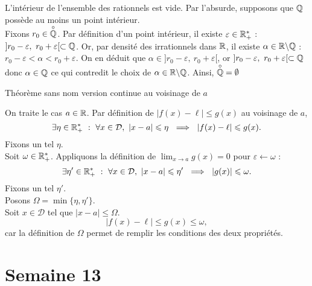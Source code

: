 \documentclass{article}
\renewenvironment{question_kholle}[2][ ]
{
	\subsection{\texorpdfstring{#2}{}}
	\notblank{#1}
	{
		\noindent #1
		\bigbreak
	}
	{}
	\begin{proof}
}
{
	\end{proof}
}
\begin{document}
\begin{question_kholle}
  [Montrons que : $ \overset{\circ}{\Q} = \emptyset $]
  {L'intérieur de l'ensemble des rationnels est vide.}
  Par l'absurde, supposons que $\mathbb Q$ possède au moins un point intérieur. \\ Fixons $r_0 \in \overset{\circ}{\mathbb Q}$. Par définition d'un point intérieur, il existe $\varepsilon \in \mathbb R _+ ^* $ : $]r_0 - \varepsilon , \ r_0 + \varepsilon[ \subset \mathbb Q$. Or, par densité des irrationnels dans $\mathbb R$, il existe $\alpha \in \mathbb R \backslash \mathbb Q$ : $r_0 - \varepsilon < \alpha < r_0 + \varepsilon$. On en déduit que $\alpha \in ]r_0 - \varepsilon , \ r_0 + \varepsilon[$, or $]r_0 - \varepsilon , \ r_0 + \varepsilon[ \subset \mathbb Q$ donc $\alpha \in \mathbb Q$ ce qui contredit le choix de $\alpha \in \mathbb R \backslash \mathbb Q$. Ainsi, $\overset{\circ}{\Q} = \emptyset$
\end{question_kholle}

\begin{question_kholle}
  {Théorème sans nom version continue au voisinage de $a$}

  On traite le cas $a\in \mathbb R$. Par définition de $|f(x) - \ell| \leq g(x)$ au voisinage de $a$,
  \[
    \exists \eta \in \mathbb R _+ ^* \ : \ \forall x \in \mathcal{D}, \ |x-a| \leqslant \eta \ \implies \ |f(x) - \ell| \leqslant g(x).
  \]
  Fixons un tel $\eta$. \\
  Soit $\omega \in \mathbb R_+ ^*$. Appliquons la définition de $\lim_{x \to a} g(x) = 0$ pour $\varepsilon \gets \omega$ :
  \[
    \exists \eta' \in \mathbb R_+ ^* \ : \ \forall x \in \mathcal{D}, \ |x-a| \leqslant \eta' \ \implies \ |g(x)| \leqslant \omega.
  \]
  Fixons un tel $\eta'$. \\
  Posons $\Omega = \min{ \{\eta,  \eta' \} }$. \\
  Soit $x\in \mathcal{D}$ tel que $|x-a| \leq \Omega$.
  \[
    |f(x) - \ell | \leq g(x) \leq \omega,
  \]
  car la définition de $\Omega$ permet de remplir les conditions des deux propriétés.
\end{question_kholle}
\pagebreak\section{Semaine 13}
\end{document}
